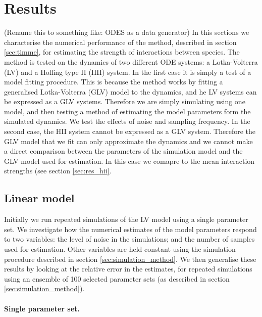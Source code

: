 \section{Results}
\label{sec:results}
(Rename this to something like: ODES as a data generator)
In this sections we characterise the numerical performance of the method, described in section \ref{sec:timme}, for estimating the strength of interactions between species. The method is tested on the dynamics of two different ODE systems: a Lotka-Volterra (LV) and a Holling type II (HII) system. In the first case it is simply a test of a model fitting procedure. This is because the method works by fitting a generalised Lotka-Volterra (GLV) model to the dynamics, and he LV systems can be expressed as a GLV systems. Therefore we are simply simulating using one model, and then testing a method of estimating the model parameters form the simulated dynamics. We test the effects of noise and sampling frequency. In the second case, the HII system cannot be expressed as a GLV system. Therefore the GLV model that we fit can only approximate the dynamics and we cannot make a direct comparison between the parameters of the simulation model and the GLV model used for estimation. In this case we comapre to the mean interaction strengths (see section \ref{sec:res_hii}.


\subsection{Linear model}
\label{sec:res_glv}

Initially we run repeated simulations of the LV model using a single parameter set. We investigate how the numerical estimates of the model parameters respond to two variables: the level of noise in the simulations; and the number of samples used for estimation. Other variables are held constant using the simulation procedure described in section \ref{sec:simulation_method}. We then generalise these results by looking at the relative error in the estimates, for repeated simulations using an ensemble of 100 selected parameter sets (as described in section \ref{sec:simulation_method}).

\paragraph*{Single parameter set.}

